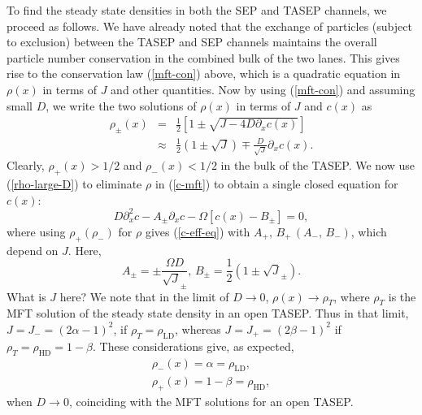 \documentclass[aps,pre,twocolumn,superscriptaddress,amsmath,amssymb,longbibliography,floatfix,nofootinbib]{revtex4}
\begin{document}
{To find the steady state densities in both the SEP and TASEP channels, we proceed as follows. We have already noted that the exchange of particles (subject to exclusion) between the TASEP and SEP channels maintains the overall particle number conservation in the combined bulk of the two lanes. This gives rise to the conservation law (\ref{mft-con}) above, which is a quadratic equation in $\rho(x)$ in terms of $J$ and other quantities. %
Now by using (\ref{mft-con}) and assuming small $D$, we write the two solutions of $\rho(x)$ in terms of $J$ and $c(x)$ as
\begin{eqnarray}
 \rho_\pm(x) &=& \frac{1}{2}\left[1\pm\sqrt{J-4D\partial_x c(x)}\right]\nonumber \\
 &\approx& \frac{1}{2}(1\pm\sqrt J)\mp \frac{D}{\sqrt J}\partial_x c(x).\label{rho-large-D}
\end{eqnarray}
Clearly, $\rho_+(x)>1/2$ and $\rho_-(x)<1/2$ in the bulk of the TASEP.  
We now use (\ref{rho-large-D}) to eliminate $\rho$ in (\ref{c-mft}) to obtain a single closed equation for $c(x)$:
\begin{equation}
 D\partial_x^2 c - A_\pm \partial_x c - \Omega [c(x) - B_\pm]=0,\label{c-eff-eq}
\end{equation}
where using $\rho_+ (\rho_-)$ for $\rho$ gives (\ref{c-eff-eq}) with $A_+,\,B_+\,(A_-,\,B_-)$, which depend on $J$. Here,
\begin{equation}
 A_\pm = \pm \frac{\Omega D}{\sqrt J_\pm},\, B_\pm=\frac{1}{2}(1 \pm \sqrt J_\pm).
\end{equation}
What is $J$ here? We note that in the limit of $D\rightarrow 0$, $\rho(x)\rightarrow \rho_T$, where $\rho_T$ is the MFT solution of the steady state density in an open TASEP. Thus in that limit, $J=J_-=(2\alpha-1)^2$, if $\rho_T=\rho_\text{LD}$, whereas $J=J_+=(2\beta-1)^2$ if $\rho_T=\rho_\text{HD}=1-\beta$. These considerations give, as expected,
\begin{eqnarray}
 \rho_-(x)=\alpha=\rho_\text{LD},\\
 \rho_+(x)=1-\beta=\rho_\text{HD},
\end{eqnarray}
when $D\rightarrow 0$, coinciding with the MFT solutions for an open TASEP.  

}
\end{document}
